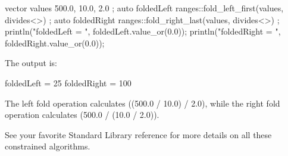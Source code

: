\begin{cpp}
vector values { 500.0, 10.0, 2.0 };
auto foldedLeft { ranges::fold_left_first(values, divides<>{}) };
auto foldedRight { ranges::fold_right_last(values, divides<>{}) };
println("foldedLeft = {}", foldedLeft.value_or(0.0));
println("foldedRight = {}", foldedRight.value_or(0.0));
\end{cpp}

The output is:

\begin{shell}
foldedLeft = 25
foldedRight = 100
\end{shell}

The left fold operation calculates ((500.0 / 10.0) / 2.0), while the right fold operation calculates (500.0 / (10.0 / 2.0)).

See your favorite Standard Library reference for more details on all these constrained algorithms.











